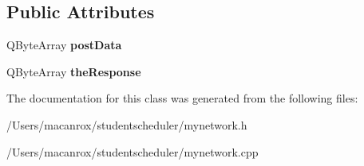 \subsection*{Public Attributes}
\begin{DoxyCompactItemize}
\item 
\hypertarget{class_my_network_afcd1907135594e46dcd19636ce4fe18b}{Q\-Byte\-Array {\bfseries post\-Data}}\label{class_my_network_afcd1907135594e46dcd19636ce4fe18b}

\item 
\hypertarget{class_my_network_a9c038e93302dd30ae02efbfaadec2851}{Q\-Byte\-Array {\bfseries the\-Response}}\label{class_my_network_a9c038e93302dd30ae02efbfaadec2851}

\end{DoxyCompactItemize}


The documentation for this class was generated from the following files\-:\begin{DoxyCompactItemize}
\item 
/\-Users/macanrox/studentscheduler/mynetwork.\-h\item 
/\-Users/macanrox/studentscheduler/mynetwork.\-cpp\end{DoxyCompactItemize}
